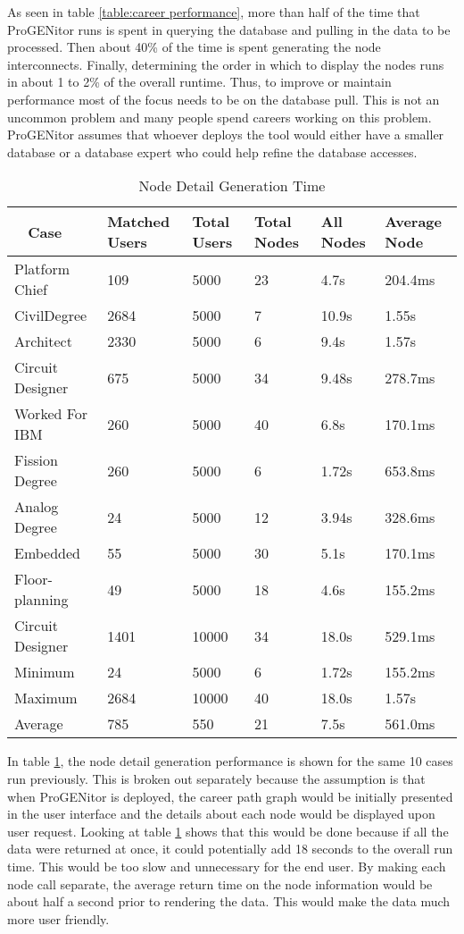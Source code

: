 As seen in table \ref{table:career performance}, more than half of the time that
ProGENitor runs is spent in querying the database and pulling in the data to be
processed.  Then about 40\% of the time is spent generating the node
interconnects. Finally, determining the order in which to display the nodes runs
in about 1 to 2\% of the overall runtime.  Thus, to improve or maintain performance most of
the focus needs to be on the database pull.  This is not an uncommon problem and
many people spend careers working on this problem.  ProGENitor assumes that
whoever deploys the tool would either have a smaller database or a database
expert who could help refine the database accesses.

\begin{table}[H]
  \centering
  \begin{tabular}{|p{17mm}|p{16mm}|p{10mm}|p{18mm}|p{19mm}|p{20mm}|}
  \hline
  \
  Case&Matched Users&Total Users&Total Nodes&All Nodes&Average Node\\
  \hline\hline
  Platform Chief&109&5000&23&4.7s&204.4ms\\ \hline
  Civil\newline Degree&2684&5000&7&10.9s&1.55s\\ \hline 
  Architect&2330&5000&6&9.4s&1.57s\\ \hline
  Circuit Designer&675&5000&34&9.48s&278.7ms\\ \hline
  Worked For IBM&260&5000&40&6.8s&170.1ms\\ \hline
  Fission Degree&260&5000&6&1.72s&653.8ms\\ \hline
  Analog Degree&24&5000&12&3.94s&328.6ms\\ \hline
  Embedded&55&5000&30&5.1s&170.1ms\\ \hline
  Floor- \newline planning&49&5000&18&4.6s&155.2ms\\ \hline
  Circuit Designer&1401&10000&34&18.0s&529.1ms\\ \hline
  \hline\hline
  Minimum&24&5000&6&1.72s&155.2ms\\ \hline
  Maximum&2684&10000&40&18.0s&1.57s\\ \hline
  Average&785&550&21&7.5s&561.0ms\\ \hline
  \end{tabular}
  \caption{Node Detail Generation Time}
  \label{table:node-perf}
\end{table}

In table \ref{table:node-perf}, the node detail generation performance is shown
for the same 10 cases run previously.  This is broken out separately because the
assumption is that when ProGENitor is deployed, the career path graph would be
initially presented in the user interface and the details about each node would be
displayed upon user request.  Looking at table \ref{table:node-perf} shows that
this would be done because if all the data were returned at once, it could
potentially add 18 seconds to the overall run time.  This would be too slow and
unnecessary for the end user.  By making each node call separate, the average
return time on the node information would be about half a second prior to
rendering the data.  This would make the data much more user friendly.